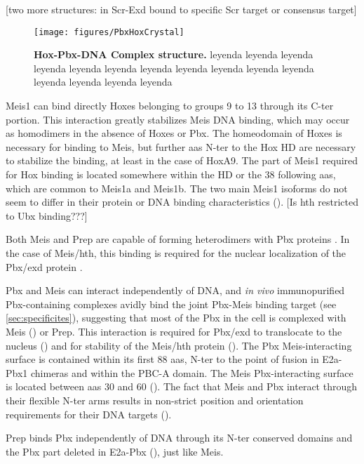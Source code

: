 [two more structures: in \cite{Joshi2007} Scr-Exd bound to specific Scr target or consensus target]

\begin{figure}[]
  
  \centering
  \texttt{[image: figures/PbxHoxCrystal]}
  \caption[Hox-Pbx-DNA Complex structure]{\textbf{Hox-Pbx-DNA Complex structure.} leyenda leyenda leyenda leyenda leyenda leyenda leyenda leyenda leyenda leyenda leyenda leyenda leyenda leyenda leyenda}
  \label{fig:PbxHoxCrystal}
\end{figure}

Meis1 can bind directly Hoxes belonging to groups 9 to 13 through its \ac{C-ter} portion. This interaction greatly stabilizes Meis DNA binding, which may occur as homodimers in the absence of Hoxes or Pbx. The homeodomain of Hoxes is necessary for binding to Meis, but further \acp{aa} \ac{N-ter} to the Hox \ac{HD} are necessary to stabilize the binding, at least in the case of HoxA9. The part of Meis1 required for Hox binding is located somewhere within the \ac{HD} or the 38 following \acp{aa}, which are common to Meis1a and Meis1b. The two main Meis1 isoforms do not seem to differ in their protein or DNA binding characteristics (\cite{Shen1997}). [Is hth restricted to Ubx binding???]

Both Meis and Prep are capable of forming heterodimers with Pbx proteins \cite{ref}. In the case of Meis/\ac{hth}, this binding is required for the nuclear localization of the Pbx/\ac{exd} protein \cite{ref}.

Pbx and Meis can interact independently of DNA, and \textit{in vivo} immunopurified Pbx-containing complexes avidly bind the joint Pbx-Meis binding target (see \ref{sec:specificites}), suggesting that most of the Pbx in the cell is complexed with Meis (\cite{Chang1997}) or Prep. This interaction is required for Pbx/exd to translocate to the nucleus (\cite{Rieckhof1997}) and for stability of the Meis/hth protein (\cite{Abu-Shaar1998}). The Pbx Meis-interacting surface is contained within its first 88 \acp{aa}, \ac{N-ter} to the point of fusion in E2a-Pbx1 chimeras and within the PBC-A domain. The Meis Pbx-interacting surface is located between \acp{aa} 30 and 60 (\cite{Chang1997}). The fact that Meis and Pbx interact through their flexible \ac{N-ter} arms results in non-strict position and orientation requirements for their DNA targets (\cite{Jacobs1999}).

Prep binds Pbx independently of DNA through its \ac{N-ter} conserved domains and the Pbx part deleted in E2a-Pbx (\cite{Berthelsen1998}), just like Meis. 

